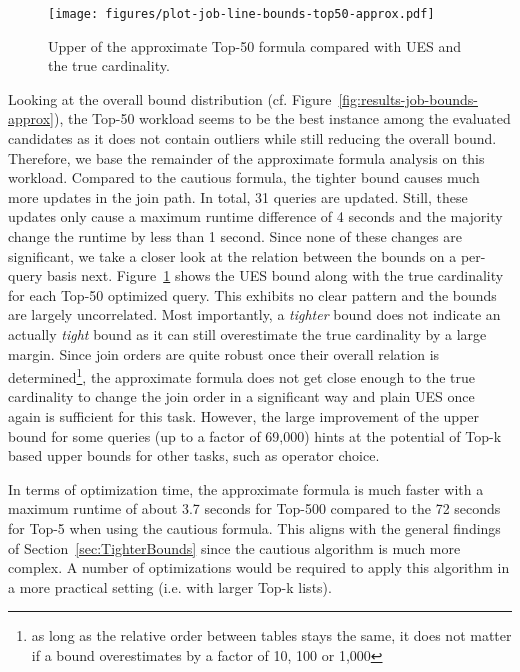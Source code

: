 \begin{figure}[tb]
    \centering
    \texttt{[image: figures/plot-job-line-bounds-top50-approx.pdf]}
    \caption{Upper of the approximate Top-50 formula compared with UES and the true cardinality.}
    \label{fig:results-job-approx-bound-comparison}
\end{figure}

Looking at the overall bound distribution (cf. Figure~\ref{fig:results-job-bounds-approx}), the Top-50 workload seems to be the best instance among the evaluated candidates as it does not contain outliers while still reducing the overall bound. Therefore, we base the remainder of the approximate formula analysis on this workload. Compared to the cautious formula, the tighter bound causes much more updates in the join path. In total, 31 queries are updated. Still, these updates only cause a maximum runtime difference of 4 seconds and the majority change the runtime by less than 1 second. Since none of these changes are significant, we take a closer look at the relation between the bounds on a per-query basis next. Figure~\ref{fig:results-job-approx-bound-comparison} shows the UES bound along with the true cardinality for each Top-50 optimized query. This exhibits no clear pattern and the bounds are largely uncorrelated. Most importantly, a \emph{tighter} bound does not indicate an actually \emph{tight} bound as it can still overestimate the true cardinality by a large margin. Since join orders are quite robust once their overall relation is determined\footnote{as long as the relative order between tables stays the same, it does not matter if a bound overestimates by a factor of 10, 100 or 1,000}, the approximate formula does not get close enough to the true cardinality to change the join order in a significant way and plain UES once again is sufficient for this task. However, the large improvement of the upper bound for some queries (up to a factor of 69,000) hints at the potential of Top-k based upper bounds for other tasks, such as operator choice.

In terms of optimization time, the approximate formula is much faster with a maximum runtime of about 3.7 seconds for Top-500 compared to the 72 seconds for Top-5 when using the cautious formula. This aligns with the general findings of Section~\ref{sec:TighterBounds} since the cautious algorithm is much more complex. A number of optimizations would be required to apply this algorithm in a more practical setting (i.e. with larger Top-k lists).

